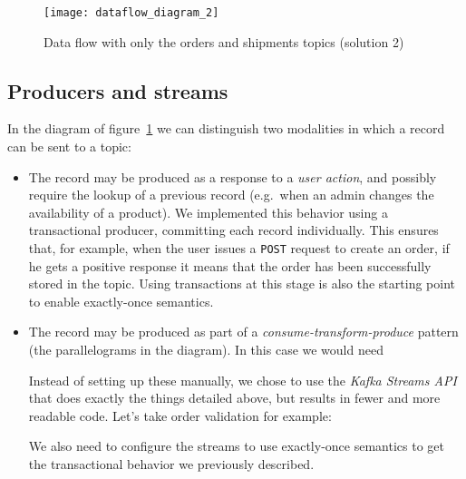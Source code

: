 \begin{figure}[p]
    \centering
    \texttt{[image: dataflow\_diagram\_2]}
    \caption{Data flow with only the orders and shipments topics (solution 2)}
    \label{fig:dataflow_diagram_2}
\end{figure}

\subsection{Producers and streams}

In the diagram of figure~\ref{fig:dataflow_diagram_2} we can distinguish two modalities in which a record can be sent to a topic:
\begin{itemize}
    \item The record may be produced as a response to a \emph{user action}, and possibly require the lookup of a previous record (e.g.\ when an admin changes the availability of a product). We implemented this behavior using a transactional producer, committing each record individually. This ensures that, for example, when the user issues a \texttt{POST} request to create an order, if he gets a positive response it means that the order has been successfully stored in the topic. Using transactions at this stage is also the starting point to enable exactly-once semantics.
    \item The record may be produced as part of a \emph{consume-transform-produce} pattern (the parallelograms in the diagram). In this case we would need
    \break
    Instead of setting up these manually, we chose to use the \emph{Kafka Streams API} that does exactly the things detailed above, but results in fewer and more readable code. Let's take order validation for example:
    We also need to configure the streams to use exactly-once semantics to get the transactional behavior we previously described.
\end{itemize}

